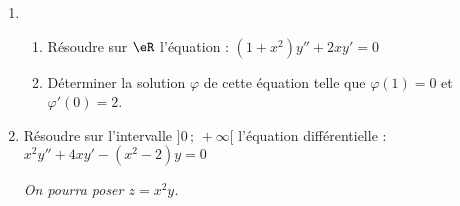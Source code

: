 
\begin{exercice}\label{exoautoanalyseCTU-39}

 

\begin{enumerate}
\item \begin{enumerate}
\item Résoudre sur $\eR$ l'équation : $(1+x^2)y''+2xy'=0$
\item Déterminer la solution $\varphi$ de cette équation telle que $\varphi(1)=0$ et $\varphi'(0)=2$.
\end{enumerate}
\item Résoudre sur l'intervalle $]0\,;\,+\infty[$ l'équation différentielle : $x^2y''+4xy'-(x^2-2)y=0$

{\itshape On pourra poser $z=x^2y$.}
\end{enumerate}






\end{exercice}
